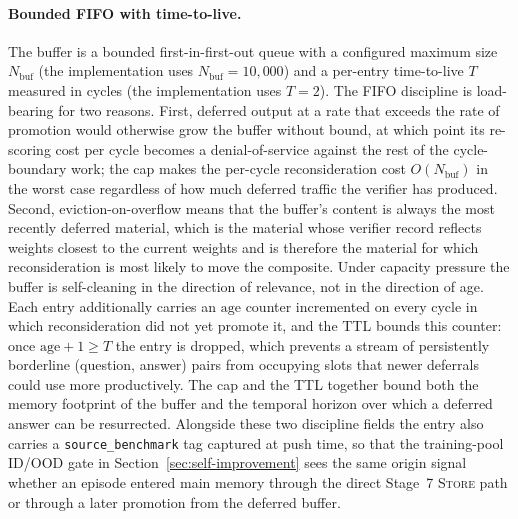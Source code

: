 \paragraph{Bounded FIFO with time-to-live.}
The buffer is a bounded first-in-first-out queue with a configured maximum size $N_{\text{buf}}$ (the implementation uses $N_{\text{buf}} = 10{,}000$) and a per-entry time-to-live $T$ measured in cycles (the implementation uses $T = 2$). The FIFO discipline is load-bearing for two reasons. First, deferred output at a rate that exceeds the rate of promotion would otherwise grow the buffer without bound, at which point its re-scoring cost per cycle becomes a denial-of-service against the rest of the cycle-boundary work; the cap makes the per-cycle reconsideration cost $O(N_{\text{buf}})$ in the worst case regardless of how much deferred traffic the verifier has produced. Second, eviction-on-overflow means that the buffer's content is always the most recently deferred material, which is the material whose verifier record reflects weights closest to the current weights and is therefore the material for which reconsideration is most likely to move the composite. Under capacity pressure the buffer is self-cleaning in the direction of relevance, not in the direction of age. Each entry additionally carries an $\mathrm{age}$ counter incremented on every cycle in which reconsideration did not yet promote it, and the TTL bounds this counter: once $\mathrm{age} + 1 \geq T$ the entry is dropped, which prevents a stream of persistently borderline (question, answer) pairs from occupying slots that newer deferrals could use more productively. The cap and the TTL together bound both the memory footprint of the buffer and the temporal horizon over which a deferred answer can be resurrected. Alongside these two discipline fields the entry also carries a \texttt{source\_benchmark} tag captured at push time, so that the training-pool ID/OOD gate in Section~\ref{sec:self-improvement} sees the same origin signal whether an episode entered main memory through the direct Stage~7 \textsc{Store} path or through a later promotion from the deferred buffer.

